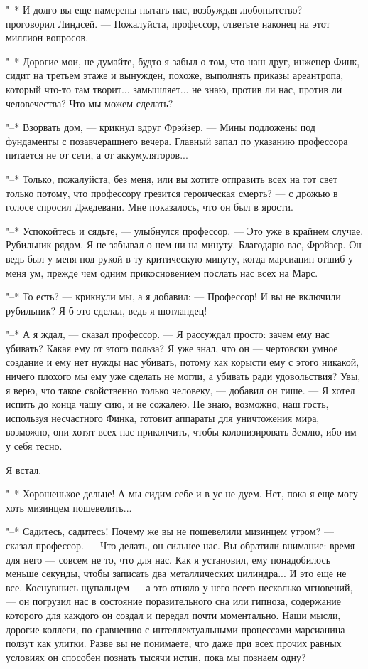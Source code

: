 "--* И  долго  вы  еще  намерены  пытать  нас,  возбуждая  любопытство?  ---
проговорил Линдсей. --- Пожалуйста,  профессор,  ответьте  наконец  на  этот
миллион вопросов.

"--* Дорогие мои, не думайте, будто я забыл о том, что наш  друг,  инженер
Финк, сидит  на  третьем  этаже  и  вынужден,  похоже,  выполнять  приказы
ареантропа, который что-то там творит... замышляет... не знаю,  против  ли
нас, против ли человечества? Что мы можем сделать?

"--*  Взорвать  дом,  ---  крикнул  вдруг  Фрэйзер.  ---  Мины  подложены  под
фундаменты с позавчерашнего вечера. Главный запал по  указанию  профессора
питается не от сети, а от аккумуляторов...

"--* Только, пожалуйста, без меня, или вы хотите  отправить  всех  на  тот
свет только потому, что профессору грезится героическая смерть? --- с дрожью
в голосе спросил Джедевани. Мне показалось, что он был в ярости.

"--* Успокойтесь и сядьте, --- улыбнулся профессор.  ---  Это  уже  в  крайнем
случае. Рубильник рядом. Я не забывал о нем ни на минуту.  Благодарю  вас,
Фрэйзер. Он ведь был у меня под  рукой  в  ту  критическую  минуту,  когда
марсианин отшиб у меня ум, прежде чем  одним  прикосновением  послать  нас
всех на Марс.

"--* То есть? --- крикнули мы, а я добавил: --- Профессор! И  вы  не  включили
рубильник? Я б это сделал, ведь я шотландец!

"--* А я ждал, --- сказал профессор. --- Я рассуждал  просто:  зачем  ему  нас
убивать? Какая ему от этого польза? Я уже знал, что он ---  чертовски  умное
создание и ему нет нужды нас убивать,  потому  как  корысти  ему  с  этого
никакой, ничего плохого мы ему  уже  сделать  не  могли,  а  убивать  ради
удовольствия? Увы, я  верю,  что  такое  свойственно  только  человеку,  ---
добавил он тише. --- Я хотел испить до конца чашу  сию,  и  не  сожалею.  Не
знаю, возможно, наш гость, используя несчастного Финка,  готовит  аппараты
для уничтожения мира, возможно,  они  хотят  всех  нас  прикончить,  чтобы
колонизировать Землю, ибо им у себя тесно.

Я встал.

"--* Хорошенькое дельце! А мы сидим себе и в ус не дуем. Нет, пока  я  еще
могу хоть мизинцем пошевелить...

"--* Садитесь, садитесь! Почему же вы  не  пошевелили  мизинцем  утром?  ---
сказал профессор. --- Что делать, он  сильнее  нас.  Вы  обратили  внимание:
время для него ---  совсем  не  то,  что  для  нас.  Как  я  установил,  ему
понадобилось меньше секунды, чтобы записать два металлических  цилиндра...
И это еще не все. Коснувшись  щупальцем  ---  а  это  отняло  у  него  всего
несколько мгновений, --- он погрузил нас в состояние поразительного сна  или
гипноза, содержание  которого  для  каждого  он  создал  и  передал  почти
моментально. Наши мысли, дорогие коллеги, по сравнению с интеллектуальными
процессами марсианина ползут как улитки. Разве вы не понимаете,  что  даже
при всех прочих равных условиях он способен познать тысячи истин, пока  мы
познаем одну?

